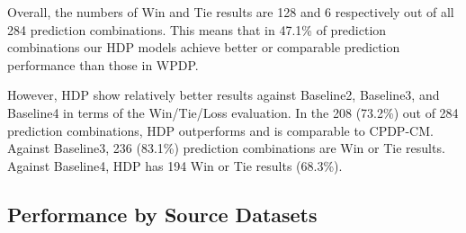 


Overall, the numbers of Win and
Tie results are 128 and 6 respectively out of all 284 prediction
combinations.
This means that in 47.1\% of prediction combinations our HDP
models achieve better or comparable prediction performance than those in
WPDP.

However, HDP show relatively better results against Baseline2, Baseline3, and Baseline4 in terms of the Win/Tie/Loss evaluation.
In the 208 (73.2\%) out of 284 prediction combinations, HDP outperforms and is comparable to CPDP-CM. Against Baseline3, 236
(83.1\%) prediction combinations are Win or Tie results. Against Baseline4, HDP has 194 Win or Tie results (68.3\%).



\subsection{Performance by Source Datasets}
\label{subsec04-0}

